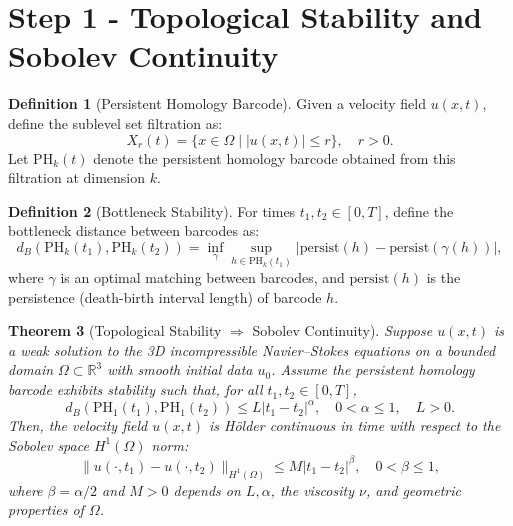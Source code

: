 \documentclass[11pt]{article}
\newtheorem{theorem}{Theorem}[section]
\theoremstyle{definition}
\newtheorem{definition}[theorem]{Definition}
\begin{document}
\section{Step 1 - Topological Stability and Sobolev Continuity}

\begin{definition}[Persistent Homology Barcode]
Given a velocity field $u(x,t)$, define the sublevel set filtration as:
\[
X_r(t) = \{x \in \Omega \mid |u(x,t)| \leq r \}, \quad r > 0.
\]
Let $\mathrm{PH}_k(t)$ denote the persistent homology barcode obtained from this filtration at dimension $k$.
\end{definition}

\begin{definition}[Bottleneck Stability]
For times $t_1, t_2 \in [0,T]$, define the bottleneck distance between barcodes as:
\[
d_B(\mathrm{PH}_k(t_1), \mathrm{PH}_k(t_2)) = \inf_{\gamma} \sup_{h \in \mathrm{PH}_k(t_1)}|\mathrm{persist}(h)-\mathrm{persist}(\gamma(h))|,
\]
where $\gamma$ is an optimal matching between barcodes, and $\mathrm{persist}(h)$ is the persistence (death-birth interval length) of barcode $h$.
\end{definition}

\begin{theorem}[Topological Stability $\Rightarrow$ Sobolev Continuity]
\label{thm:topological_sobolev_continuity}
Suppose $u(x,t)$ is a weak solution to the 3D incompressible Navier--Stokes equations on a bounded domain $\Omega \subset \mathbb{R}^3$ with smooth initial data $u_0$. Assume the persistent homology barcode exhibits stability such that, for all $t_1,t_2\in[0,T]$,
\[
d_B(\mathrm{PH}_1(t_1), \mathrm{PH}_1(t_2)) \leq L|t_1-t_2|^{\alpha}, \quad 0 < \alpha \leq 1, \quad L > 0.
\]
Then, the velocity field $u(x,t)$ is H\"older continuous in time with respect to the Sobolev space $H^1(\Omega)$ norm:
\[
\|u(\cdot,t_1)-u(\cdot,t_2)\|_{H^1(\Omega)} \leq M|t_1-t_2|^{\beta}, \quad 0<\beta\leq 1,
\]
where $\beta = \alpha/2$ and $M > 0$ depends on $L, \alpha$, the viscosity $\nu$, and geometric properties of $\Omega$.
\end{theorem}
\end{document}
